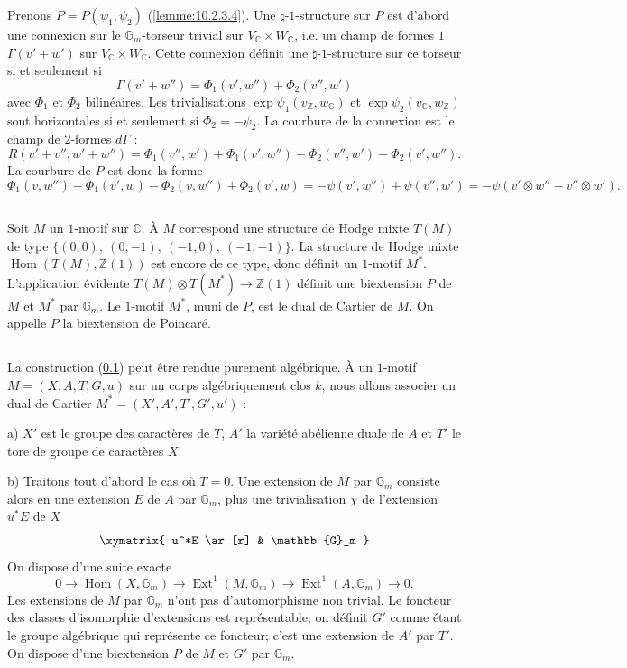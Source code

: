 \documentclass[12pt,a4paper]{amsart}
\theoremstyle{plain}
\theoremstyle{definition}
\theoremstyle{remark}
\DeclareMathOperator{\Hom}{Hom}
\DeclareMathOperator{\Ext}{Ext}
\numberwithin{equation}{section}
\begin{document}
Prenons $P=P(\psi_1,\psi_2)$ (\ref{lemme:10.2.3.4}). Une $\natural$-$1$-structure sur $P$ est d'abord une connexion sur le $\mathbb{G}_m$-torseur trivial sur $V_\mathbb{C}\times W_\mathbb{C}$, i.e. un champ de formes $1$ $\Gamma(v'+w')$ sur $V_\mathbb{C}\times W_\mathbb{C}$. Cette connexion définit une $\natural$-$1$-structure sur ce torseur si et seulement si
\[
\Gamma(v'+w'')=\Phi_1(v',w'')+\Phi_2(v'',w')
\]
avec $\Phi_1$ et $\Phi_2$ bilinéaires. Les trivialisations $\exp\psi_1(v_\mathbb{Z},w_\mathbb{C})$ et $\exp\psi_2(v_\mathbb{C},w_\mathbb{Z})$ sont horizontales si et seulement si $\Phi_2=-\psi_2$. La courbure de la connexion est le champ de $2$-formes $d\Gamma$ :
\[
R(v'+v'',w'+w'')=\Phi_1(v'',w')+\Phi_1(v',w'')-\Phi_2(v'',w')-\Phi_2(v',w'').
\]
La courbure de $P$ est donc la forme
\[
\Phi_1(v,w'')-\Phi_1(v',w)-\Phi_2(v,w'')+\Phi_2(v',w)=-\psi(v',w'')+\psi(v'',w')=-\psi(v'\otimes w''-v''\otimes w').
\]

\subsection{}\label{10.2.10}
Soit $M$ un $1$-motif sur $\mathbb{C}$. À $M$ correspond une structure de Hodge mixte $T(M)$ de type $\{(0,0),\ (0,-1),\ (-1,0),\ (-1,-1)\}$. La structure de Hodge mixte $\Hom(T(M),\mathbb{Z}(1))$ est encore de ce type, donc définit un $1$-motif $M^*$. L'application évidente $T(M)\otimes T(M^*)\to\mathbb{Z}(1)$ définit une biextension $P$ de $M$ et $M^*$ par $\mathbb{G}_m$. Le $1$-motif $M^*$, muni de $P$, est le dual de Cartier de $M$. On appelle $P$ la biextension de Poincaré.

\subsection{}\label{10.2.11}
La construction (\ref{10.2.10}) peut être rendue purement algébrique. À un $1$-motif $M=(X,A,T,G,u)$ sur un corps algébriquement clos $k$, nous allons associer un dual de Cartier $M^*=(X',A',T',G',u')$ :

a) $X'$ est le groupe des caractères de $T$, $A'$ la variété abélienne duale de $A$ et $T'$ le tore de groupe de caractères $X$.

b) Traitons tout d'abord le cas où $T=0$. Une extension de $M$ par $\mathbb{G}_m$ consiste alors en une extension $E$ de $A$ par $\mathbb{G}_m$, plus une trivialisation $\chi$ de l'extension $u^*E$ de $X$
\[
\xymatrix{
u^*E \ar[r] & \mathbb{G}_m
}
\]
On dispose d'une suite exacte
\[
0 \longrightarrow \Hom(X,\mathbb{G}_m) \longrightarrow \Ext^1(M,\mathbb{G}_m) \longrightarrow \Ext^1(A,\mathbb{G}_m) \longrightarrow 0.
\]
Les extensions de $M$ par $\mathbb{G}_m$ n'ont pas d'automorphisme non trivial. Le foncteur des classes d'isomorphie d'extensions est représentable; on définit $G'$ comme étant le groupe algébrique qui représente ce foncteur; c'est une extension de $A'$ par $T'$. On dispose d'une biextension $P$ de $M$ et $G'$ par $\mathbb{G}_m$.
\end{document}
